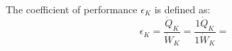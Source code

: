 The coefficient of performance \( \epsilon_K \) is defined as:  
\[
\epsilon_K = \frac{\dot{Q}_K}{\dot{W}_K} = \frac{1\dot{Q}_K}{1\dot{W}_K} =
\]